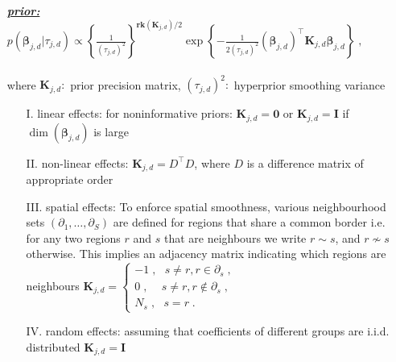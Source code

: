 \documentclass[a4paper,12pt]{scrartcl} %
\newcommand{\nin}{\not\in}
\newcommand{\bs}{\boldsymbol}  %
\newcommand{\bjd}{\bs{\beta}_{j,d}}
\newcommand{\tjd}{\tau_{j,d}}
\newcommand{\Kjd}{\bs{K}_{j,d}}
\begin{document}
\begin{itemize}
\item[\underline{\textbf{\textit{prior:}}}] $p\left(\bjd | \tjd\right)\propto \left\{\frac{1}{(\tjd)^2}\right\}^{\textbf{rk}(\Kjd)/2}\exp\left\{-\frac{1}{2(\tjd)^2}\left(\bjd\right)^{\top}\Kjd\bjd\right\}\;,$\\\\
where $\Kjd:$ prior precision matrix, $(\tjd)^2:$ hyperprior smoothing variance
\begin{itemize}
\item[I. linear effects:] for noninformative priors: $\Kjd=\bs{0}$ or $\Kjd = \bs{I}$ if $\dim (\bjd)$ is large
\item[II. non-linear effects:]  $\Kjd=D^{\top}D$, where $D$ is a difference matrix of appropriate order
\item[III. spatial effects:] To enforce spatial smoothness, various neighbourhood sets $(\partial_1,\ldots,\partial_S)$ are defined for regions that share a common border i.e. for any two regions $r$ and $s$ that are neighbours we write $r\sim s$,
and $r\not\sim s$ otherwise. This implies an adjacency matrix indicating which regions are neighbours 
$
\Kjd=
\begin{cases}
-1\;,~~~s\neq r,r\in\partial_s\;,\\
0\;,~~\;~~s\neq r,r\nin\partial_s\;,\\
N_s\;,~~~s=r\;.
\end{cases}
$
\item[IV. random effects:] assuming that coefficients of different groups are i.i.d. distributed $\Kjd=\bs{I}$
\end{itemize}
\end{itemize}
\clearpage
%
%
%
%
%
\end{document}
